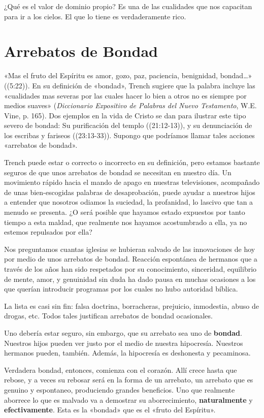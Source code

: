 \documentclass[12pt, twoside, openright]{book}
\begin{document}
¿Qué es el valor de dominio propio? Es una de las cualidades que nos capacitan para ir a los cielos. El que lo tiene es verdaderamente rico.

\section{Arrebatos de Bondad}
«Mas el fruto del Espíritu es amor, gozo, paz, paciencia, benignidad, bondad…» ((5:22)). En su definición de «bondad», Trench sugiere que la palabra incluye las «cualidades mas severas por las cuales hacer lo bien a otros no es siempre por medios suaves» (\textit{Diccionario Expositivo de Palabras del Nuevo Testamento}, W.E. Vine, p. 165). Dos ejemplos en la vida de Cristo se dan para ilustrar este tipo severo de bondad: Su purificación del templo ((21:12-13)), y su denunciación de los escribas y fariseos ((23:13-33)). Supongo que podríamos llamar tales acciones «arrebatos de bondad».

Trench puede estar o correcto o incorrecto en su definición, pero estamos bastante seguros de que unos arrebatos de bondad se necesitan en nuestro día. Un movimiento rápido hacia el mando de apago en nuestras televisiones, acompañado de unas bien-escogidas palabras de desaprobación, puede ayudar a nuestros hijos a entender que nosotros odiamos la suciedad, la profanidad, lo lascivo que tan a menudo se presenta. ¿O será posible que hayamos estado expuestos por tanto tiempo a esta maldad, que realmente nos hayamos acostumbrado a ella, ya no estemos repulsados por ella?

Nos preguntamos cuantas iglesias se hubieran salvado de las innovaciones de hoy por medio de unos arrebatos de bondad. Reacción espontánea de hermanos que a través de los años han sido respetados por su conocimiento, sinceridad, equilibrio de mente, amor, y genuinidad sin duda ha dado pausa en muchas ocasiones a los que querían introducir programas por los cuales no hubo autoridad bíblica.

La lista es casi sin fin: falsa doctrina, borracheras, prejuicio, inmodestia, abuso de drogas, etc. Todos tales justifican arrebatos de bondad ocasionales.

Uno debería estar seguro, sin embargo, que su arrebato sea uno de \textbf{bondad}. Nuestros hijos pueden ver justo por el medio de nuestra hipocresía. Nuestros hermanos pueden, también. Además, la hipocresía es deshonesta y pecaminosa.

Verdadera bondad, entonces, comienza con el corazón. Allí crece hasta que rebose, y a veces su rebosar será en la forma de un arrebato, un arrebato que es genuino y espontaneo, produciendo grandes beneficios. Uno que realmente aborrece lo que es malvado va a demostrar su aborrecimiento, \textbf{naturalmente} y \textbf{efectivamente}. Esta es la «bondad» que es el «fruto del Espíritu».
\end{document}

